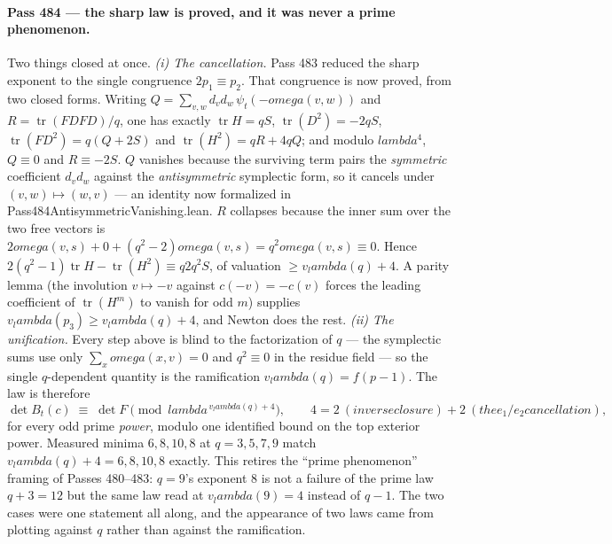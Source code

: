 \documentclass[12pt,a4paper]{article}
\def\textbf#1{#1}%
\def\texttt#1{#1}%
\def\text#1{#1}%
\def\omega{omega}%
\def\lambda{lambda}%
\def\cdot{ }%
\theoremstyle{definition}
\begin{document}
\paragraph{Pass 484 --- the sharp law is proved, and it was never a prime
phenomenon.}
Two things closed at once.  \emph{(i) The cancellation.}  Pass 483 reduced the
sharp exponent to the single congruence $2p_1\equiv p_2$.  That congruence is
now proved, from two closed forms.  Writing
$Q=\sum_{v,w}d_vd_w\,\psi_t(-\omega(v,w))$ and $R=\operatorname{tr}(FDFD)/q$,
one has exactly $\operatorname{tr}H=qS$, $\operatorname{tr}(D^2)=-2qS$,
$\operatorname{tr}(FD^2)=q(Q+2S)$ and $\operatorname{tr}(H^2)=qR+4qQ$; and
modulo $\lambda^4$, $Q\equiv0$ and $R\equiv-2S$.  \textbf{$Q$ vanishes because
the surviving term pairs the \emph{symmetric} coefficient $d_vd_w$ against the
\emph{antisymmetric} symplectic form}, so it cancels under $(v,w)\mapsto(w,v)$
--- an identity now formalized in \texttt{Pass484AntisymmetricVanishing.lean}.
$R$ collapses because the inner sum over the two free vectors is
$2\omega(v,s)+0+(q^2{-}2)\omega(v,s)=q^2\omega(v,s)\equiv0$.  Hence
$2(q^2{-}1)\operatorname{tr}H-\operatorname{tr}(H^2)\equiv q\cdot 2q^2S$, of
valuation $\ge v_\lambda(q)+4$.  A parity lemma (the involution $v\mapsto-v$
against $c(-v)=-c(v)$ forces the leading coefficient of $\operatorname{tr}(H^m)$
to vanish for odd $m$) supplies $v_\lambda(p_3)\ge v_\lambda(q)+4$, and Newton
does the rest.  \emph{(ii) The unification.}  Every step above is blind to the
factorization of $q$ --- the symplectic sums use only
$\sum_x\omega(x,v)=0$ and $q^2\equiv0$ in the residue field --- so the single
$q$-dependent quantity is the ramification $v_\lambda(q)=f(p{-}1)$.  The law is
therefore
\[
\det B_t(c)\;\equiv\;\det F \pmod{\lambda^{\,v_\lambda(q)+4}},
\qquad 4 = 2\ (\text{inverse closure}) + 2\ (\text{the } e_1/e_2 \text{
cancellation}),
\]
for every odd prime \emph{power}, modulo one identified bound on the top
exterior power.  Measured minima $6,8,10,8$ at $q=3,5,7,9$ match
$v_\lambda(q)+4=6,8,10,8$ exactly.  \textbf{This retires the ``prime
phenomenon'' framing of Passes 480--483}: $q=9$'s exponent $8$ is not a failure
of the prime law $q+3=12$ but the same law read at $v_\lambda(9)=4$ instead of
$q-1$.  The two cases were one statement all along, and the appearance of two
laws came from plotting against $q$ rather than against the ramification.
\end{document}
